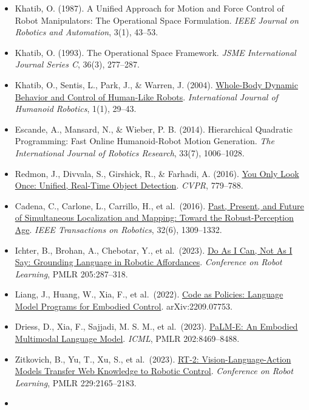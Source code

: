 \begin{itemize}
\item
  Khatib, O. (1987). A Unified Approach for Motion and Force Control of Robot Manipulators: The Operational Space Formulation. \emph{IEEE Journal on Robotics and Automation}, 3(1), 43--53.
\item
  Khatib, O. (1993). The Operational Space Framework. \emph{JSME International Journal Series C}, 36(3), 277--287.
\item
  Khatib, O., Sentis, L., Park, J., \& Warren, J. (2004). \href{https://khatib.stanford.edu/publications/pdfs/Khatib_2004_IJHR.pdf}{Whole-Body Dynamic Behavior and Control of Human-Like Robots}. \emph{International Journal of Humanoid Robotics}, 1(1), 29--43.
\item
  Escande, A., Mansard, N., \& Wieber, P. B. (2014). Hierarchical Quadratic Programming: Fast Online Humanoid-Robot Motion Generation. \emph{The International Journal of Robotics Research}, 33(7), 1006--1028.
\item
  Redmon, J., Divvala, S., Girshick, R., \& Farhadi, A. (2016). \href{https://openaccess.thecvf.com/content_cvpr_2016/html/Redmon_You_Only_Look_CVPR_2016_paper.html}{You Only Look Once: Unified, Real-Time Object Detection}. \emph{CVPR}, 779--788.
\item
  Cadena, C., Carlone, L., Carrillo, H., et al.~(2016). \href{https://arxiv.org/abs/1606.05830}{Past, Present, and Future of Simultaneous Localization and Mapping: Toward the Robust-Perception Age}. \emph{IEEE Transactions on Robotics}, 32(6), 1309--1332.
\item
  Ichter, B., Brohan, A., Chebotar, Y., et al.~(2023). \href{https://proceedings.mlr.press/v205/ichter23a.html}{Do As I Can, Not As I Say: Grounding Language in Robotic Affordances}. \emph{Conference on Robot Learning}, PMLR 205:287--318.
\item
  Liang, J., Huang, W., Xia, F., et al.~(2022). \href{https://arxiv.org/abs/2209.07753}{Code as Policies: Language Model Programs for Embodied Control}. arXiv:2209.07753.
\item
  Driess, D., Xia, F., Sajjadi, M. S. M., et al.~(2023). \href{https://proceedings.mlr.press/v202/driess23a.html}{PaLM-E: An Embodied Multimodal Language Model}. \emph{ICML}, PMLR 202:8469--8488.
\item
  Zitkovich, B., Yu, T., Xu, S., et al.~(2023). \href{https://proceedings.mlr.press/v229/zitkovich23a.html}{RT-2: Vision-Language-Action Models Transfer Web Knowledge to Robotic Control}. \emph{Conference on Robot Learning}, PMLR 229:2165--2183.
\item

\end{itemize}
